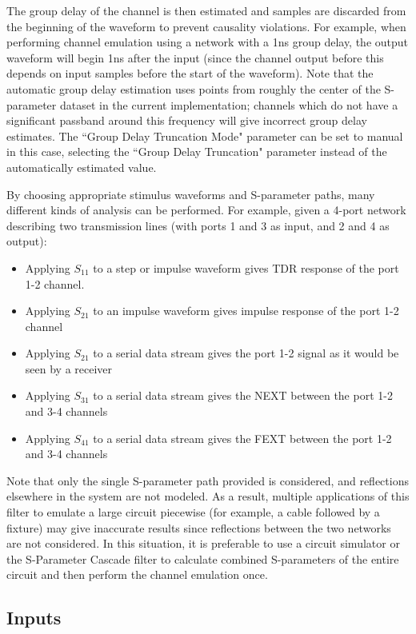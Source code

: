 The group delay of the channel is then estimated and samples are discarded from the beginning of the waveform to
prevent causality violations. For example, when performing channel emulation using a network with a 1ns group delay,
the output waveform will begin 1ns after the input (since the channel output before this depends on input samples
before the start of the waveform). Note that the automatic group delay estimation uses points from roughly the center
of the S-parameter dataset in the current implementation; channels which do not have a significant passband around this
frequency will give incorrect group delay estimates. The ``Group Delay Truncation Mode" parameter can be set to manual
in this case, selecting the ``Group Delay Truncation" parameter instead of the automatically estimated value.

By choosing appropriate stimulus waveforms and S-parameter paths, many different kinds of analysis can be performed.
For example, given a 4-port network describing two transmission lines (with ports 1 and 3 as input, and 2 and 4 as
output):
\begin{itemize}
\item Applying $S_{11}$ to a step or impulse waveform gives TDR response of the port 1-2 channel.
\item Applying $S_{21}$ to an impulse waveform gives impulse response of the port 1-2 channel
\item Applying $S_{21}$ to a serial data stream gives the port 1-2 signal as it would be seen by a receiver
\item Applying $S_{31}$ to a serial data stream gives the NEXT between the port 1-2 and 3-4 channels
\item Applying $S_{41}$ to a serial data stream gives the FEXT between the port 1-2 and 3-4 channels
\end{itemize}

Note that only the single S-parameter path provided is considered, and reflections elsewhere in the system are not
modeled. As a result, multiple applications of this filter to emulate a large circuit piecewise (for example, a cable
followed by a fixture) may give inaccurate results since reflections between the two networks are not considered. In
this situation, it is preferable to use a circuit simulator or the S-Parameter Cascade filter to calculate combined
S-parameters of the entire circuit and then perform the channel emulation once.

\subsection{Inputs}

